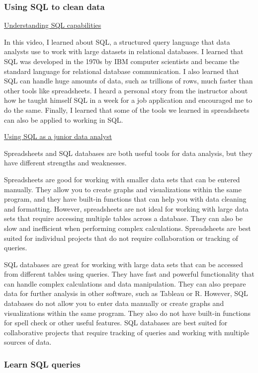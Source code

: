 \documentclass[]{article}
\begin{document}
\subsubsection{Using SQL to clean data}

\uline{Understanding SQL capabilities}

In this video, I learned about SQL, a structured query language that data analysts use to work with large datasets in relational databases. I learned that SQL was developed in the 1970s by IBM computer scientists and became the standard language for relational database communication. I also learned that SQL can handle huge amounts of data, such as trillions of rows, much faster than other tools like spreadsheets. I heard a personal story from the instructor about how he taught himself SQL in a week for a job application and encouraged me to do the same. Finally, I learned that some of the tools we learned in spreadsheets can also be applied to working in SQL.

\uline{Using SQL as a junior data analyst}

Spreadsheets and SQL databases are both useful tools for data analysis, but they have different strengths and weaknesses.

Spreadsheets are good for working with smaller data sets that can be entered manually. They allow you to create graphs and visualizations within the same program, and they have built-in functions that can help you with data cleaning and formatting. However, spreadsheets are not ideal for working with large data sets that require accessing multiple tables across a database. They can also be slow and inefficient when performing complex calculations. Spreadsheets are best suited for individual projects that do not require collaboration or tracking of queries.

SQL databases are great for working with large data sets that can be accessed from different tables using queries. They have fast and powerful functionality that can handle complex calculations and data manipulation. They can also prepare data for further analysis in other software, such as Tableau or R. However, SQL databases do not allow you to enter data manually or create graphs and visualizations within the same program. They also do not have built-in functions for spell check or other useful features. SQL databases are best suited for collaborative projects that require tracking of queries and working with multiple sources of data.

\subsubsection{Learn SQL queries}
\end{document}
